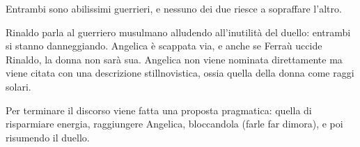 \documentclass[a4paper]{article}
\begin{document}
Entrambi sono abilissimi guerrieri, e nessuno dei due riesce a sopraffare l'altro.

\begin{center} %
\begin{minipage}{0.5\textwidth}
\centering
{}
\end{minipage}
\end{center}

Rinaldo parla al guerriero musulmano alludendo all'inutilità del duello: entrambi si stanno danneggiando.
Angelica è scappata via, e anche se Ferraù uccide Rinaldo, la donna non sarà sua.
Angelica non viene nominata direttamente ma viene citata con
una descrizione stillnovistica, ossia quella della donna come raggi solari.

\begin{center} %
\begin{minipage}{0.5\textwidth}
\centering
{}
\end{minipage}
\end{center}

Per terminare il discorso viene fatta una proposta pragmatica:
quella di risparmiare energia, raggiungere Angelica, bloccandola (farle far dimora),
e poi risumendo il duello.
\end{document}
